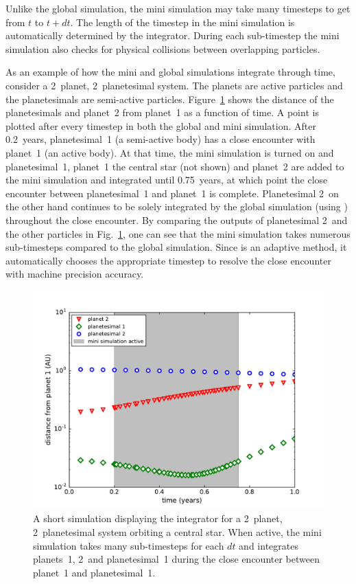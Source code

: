 Unlike the global simulation, the mini simulation may take many timesteps to get from $t$ to $t + dt$.
The length of the timestep in the mini simulation is automatically determined by the \ias integrator.
During each sub-timestep the mini simulation also checks for physical collisions between overlapping particles. 

As an example of how the mini and global simulations integrate through time, consider a 2~planet, 2~planetesimal system. 
The planets are active particles and the planetesimals are semi-active particles.
Figure~\ref{fig:CE_fig} shows the distance of the planetesimals and planet~2 from planet~1 as a function of time. 
A point is plotted after every timestep in both the global and mini simulation. 
After 0.2~years, planetesimal~1 (a semi-active body) has a close encounter with planet~1 (an active body). 
At that time, the mini simulation is turned on and planetesimal~1, planet~1 the central star (not shown) and planet~2 are added to the mini simulation and integrated until 0.75~years, at which point the close encounter between planetesimal~1 and planet~1 is complete.
Planetesimal 2~on the other hand continues to be solely integrated by the global simulation (using \whfast) throughout the close encounter.
By comparing the outputs of planetesimal 2~and the other particles in Fig.~\ref{fig:CE_fig}, one can see that the mini simulation takes numerous sub-timesteps compared to the global simulation.
Since \ias is an adaptive method, it automatically chooses the appropriate timestep to resolve the close encounter with machine precision accuracy.

\begin{figure}
\centerline{\includegraphics[scale=0.45]{chap4/images/CE_fig.pdf}}
\caption{
    A short simulation displaying the \hermes integrator for a 2~planet, 2~planetesimal system orbiting a central star. 
When active, the mini simulation takes many sub-timesteps for each $dt$ and integrates planets~1, 2~and planetesimal~1 during the close encounter between planet~1 and planetesimal~1. 
 }
\label{fig:CE_fig}
\end{figure}

